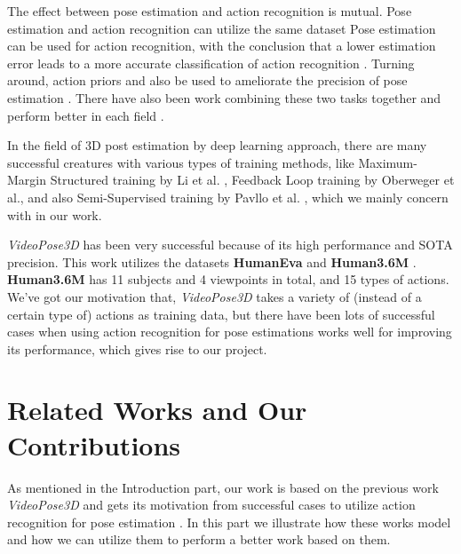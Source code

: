 \documentclass[10pt,twocolumn,letterpaper]{article}
\begin{document}
The effect between pose estimation and action recognition is mutual. Pose estimation
and action recognition can utilize the same dataset \cite{jhuang2013towards, andriluka2018posetrack}
Pose estimation can be used for action recognition, with the conclusion that a lower
estimation error leads to a more accurate classification of action recognition \cite{yao2011does}. 
Turning around, action priors and also be used to ameliorate the precision of pose estimation 
\cite{yao2012coupled, iqbal2017pose, gall20102d}. There have also been work combining these two tasks 
together and perform better in each field \cite{7298734, luvizon20182d}.


In the field of 3D post estimation by deep learning approach, there are many successful creatures 
with various types of training methods, like Maximum-Margin Structured training by Li et al. 
\cite{li2015maximum}, Feedback Loop training by Oberweger et al.\cite{oberweger2015training}, and 
also Semi-Supervised training by Pavllo et al. \cite{pavllo20193d}, which we mainly concern with 
in our work.

\textit{VideoPose3D} has been very successful because of its high performance and SOTA precision.
This work utilizes the datasets \textbf{HumanEva} \cite{sigal2010humaneva} and \textbf{Human3.6M} 
\cite{ionescu2013human3}. \textbf{Human3.6M} has 11 subjects and 4 viewpoints in total, and 15 types of actions.
We've got our motivation that, \textit{VideoPose3D} takes a variety of (instead of a certain type of) actions 
as training data, but there have been lots of successful cases when using action recognition for pose estimations 
works well for improving its performance, which gives rise to our project.

\section{Related Works and Our Contributions}

As mentioned in the Introduction part, our work is based on the previous work \textit{VideoPose3D} 
\cite{pavllo20193d} and gets its motivation from successful cases to utilize action recognition for 
pose estimation \cite{yao2012coupled, iqbal2017pose, gall20102d}. In this part we illustrate how
these works model and how we can utilize them to perform a better work based on them.

\end{document}
